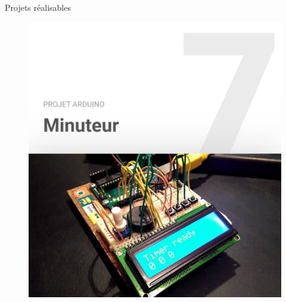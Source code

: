 \documentclass[]{beamer}
\begin{document}
	\begin{frame}
	{Projets réalisables}
			\begin{figure}
				\begin{center}
					\includegraphics[scale=0.4]{muniteur.png}
				\end{center}
			\end{figure}
	\end{frame}
\end{document}
